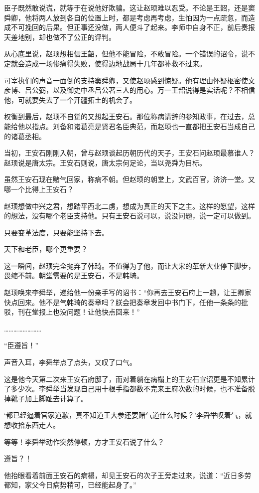 臣子既然敢说谎，就等于在说他好欺骗。这让赵顼难以忍受。不论是王韶，还是窦舜卿，他将两人放到各自的位置上时，都是考虑再考虑，生怕因为一点疏忽，而造成不可挽回的后果。但正事还没做，两人便斗了起来。李师中自身不正，前后奏报天差地别，却也做不了公正的评判。

从心底里说，赵顼想相信王韶，但他不能冒险，不敢冒险。一个错误的诏令，说不定就会造成一场惨痛得失败，使得边地战局十几年都补救不过来。

可宰执们的声音一面倒的支持窦舜卿，又使赵顼感到惊疑。他有理由怀疑枢密使文彦博、吕公弼，以及御史中丞吕公著三人的用心。万一王韶说得是实话呢？不相信他，可就要失去了一个开疆拓土的机会了。

权衡到最后，赵顼不自觉的又想起王安石。那位称病请辞的参知政事，在过去，总能给他以指点。刘备和诸葛亮是贤君名臣典范，而赵顼也一直都把王安石当成自己的诸葛丞相。

当初，王安石刚刚入朝，曾与赵顼谈起历朝历代的天子，王安石问赵顼最慕谁人？赵顼说是唐太宗。王安石则说，唐太宗何足论，当以尧舜为目标。

虽然王安石现在赌气回家，称病不朝。但赵顼的朝堂上，文武百官，济济一堂。又哪一个比得上王安石？

赵顼想做中兴之君，想踏平西北二虏，想成为真正的天下之主。这样的愿望，这样的想法，没有哪个老臣支持他。只有王安石说可以，说没问题，说一定可以做到。

只要变革法度，只要能坚持下去。

天下和老臣，哪个更重要？

这一瞬间，赵顼完全抛弃了韩琦。不值得为了他，而让大宋的革新大业停下脚步，畏缩不前。朝堂需要的是王安石，不是韩琦。

赵顼唤来李舜举，递给他一份亲手写的诏书：“你再去王安石府上一趟，让王卿家快点回来。他不是气韩琦的奏章吗？朕会把奏章发回中书门下，任他一条条的批驳，刊在堂报上也没问题！让他快点回来！”

……………………

“臣遵旨！”

声音入耳，李舜举点了点头，又叹了口气。

这是他今天第二次来王安石府邸了，而对着躺在病榻上的王安石宣诏更是不知累计了多少次。李舜举当发现自己用十根手指都数不完来王府次数的时候，也不准备脱掉靴子加上脚趾去计算了。

‘都已经逼着官家道歉，真不知道王大参还要赌气道什么时候？’李舜举叹着气，就想收拾东西走人。

等等！李舜举动作突然停顿，方才王安石说了什么？

遵旨？！

他抬眼看着前面王安石的病榻，却见王安石的次子王旁走过来，说道：“近日多劳都知，家父今日病势稍可，已经能起身了。”

